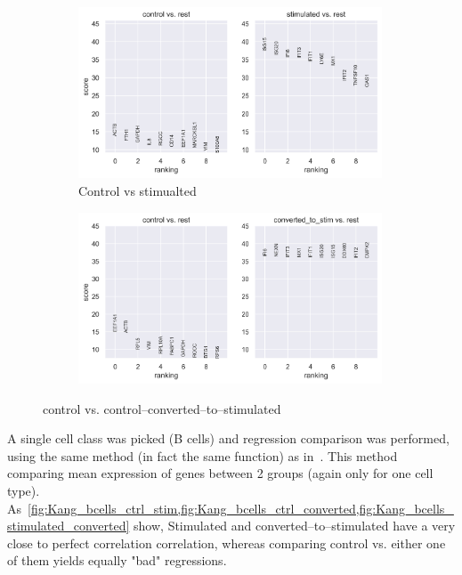 \documentclass[11pt, a4paper]{report}
\theoremstyle{plain}
\theoremstyle{definition}
\theoremstyle{remark}
\begin{document}
\begin{figure}[h]
\centering
\begin{subfigure}[t]{0.99\textwidth}
\includegraphics[width=0.99\textwidth]{images/Kang_super_val_ctrl_vs_stimulated.png}
\caption{Control vs stimualted}
\end{subfigure}
\begin{subfigure}[t]{0.99\textwidth}
\includegraphics[width=0.99\textwidth]{images/Kang_super_val_ctrl_vs_converted.png}
\caption{}
\end{subfigure}
\caption{control vs. control--converted--to--stimulated}
\label{fig:Kang_super_gene_markers}
\end{figure}

A single cell class was picked (B cells) and regression comparison was performed,
using the same method (in fact the same function) as
in~\cite{lotfollahi2019scgen}. This method comparing mean expression of genes
between 2 groups (again only for one cell type).
As~\cref{fig:Kang_bcells_ctrl_stim,fig:Kang_bcells_ctrl_converted,fig:Kang_bcells_stimulated_converted} show,
Stimulated and converted--to--stimulated have a very close to perfect
correlation correlation, whereas comparing control vs. either one of them yields 
equally "bad" regressions.
\end{document}
